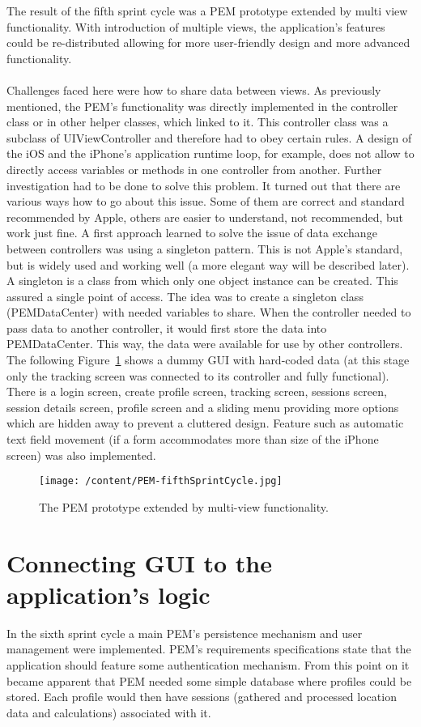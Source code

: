 \documentclass[12pt, a4paper]{report}   %
\begin{document}
\begin{enumerate}
The result of the fifth sprint cycle was a PEM prototype extended by multi view functionality. With introduction of multiple views, the application's features could be re-distributed allowing for more user-friendly design and more advanced functionality.\\ \\
Challenges faced here were how to share data between views. As previously mentioned, the PEM's functionality was directly implemented in the controller class or in other helper classes, which linked to it. This controller class was a subclass of UIViewController and therefore had to obey certain rules. A design of the iOS and the iPhone's application runtime loop, for example, does not allow to directly access variables or methods in one controller from another. Further investigation had to be done to solve this problem. It turned out that there are various ways how to go about this issue. Some of them are correct and standard recommended by Apple, others are easier to understand, not recommended, but work just fine. A first approach learned to solve the issue of data exchange between controllers was using a singleton pattern. This is not Apple's standard, but is widely used and working well (a more elegant way will be described later). A singleton is a class from which only one object instance can be created. This assured a single point of access. The idea was to create a singleton class (PEMDataCenter) with needed variables to share. When the controller needed to pass data to another controller, it would first store the data into PEMDataCenter. This way, the data were available for use by other controllers. The following Figure~\ref{PEM-fifthSprintCycle} shows a dummy GUI with hard-coded data (at this stage only the tracking screen was connected to its controller and fully functional). There is a login screen, create profile screen, tracking screen, sessions screen, session details screen, profile screen and a sliding menu providing more options which are hidden away to prevent a cluttered design. Feature such as automatic text field movement (if a form accommodates more than size of the iPhone screen) was also implemented.


\begin{figure}[H]
  \centering
	\texttt{[image: /content/PEM-fifthSprintCycle.jpg]}
	  \caption{The PEM prototype extended by multi-view functionality.}
	  \label{PEM-fifthSprintCycle}
\end{figure}


\clearpage
\section{Connecting GUI to the application's logic}
In the sixth sprint cycle a main PEM's persistence mechanism and user management were implemented. PEM's requirements specifications state that the application should feature some authentication mechanism. From this point on it became apparent that PEM needed some simple database where profiles could be stored. Each profile would then have sessions (gathered and processed location data and calculations) associated with it.



\end{enumerate}
\end{document}
